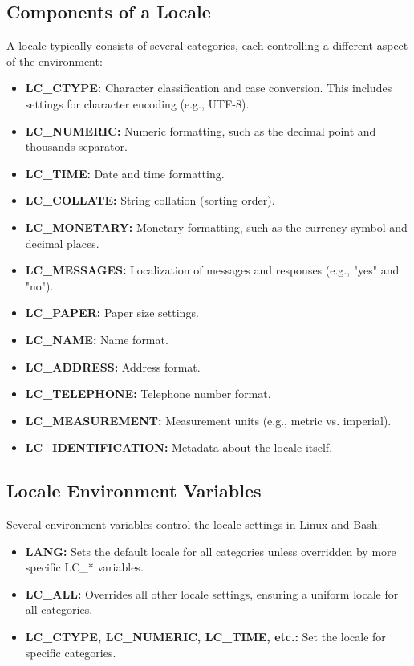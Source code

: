 \documentclass{report}
\begin{document}
    \subsection{Components of a Locale}
    \bigbreak \noindent 
    A locale typically consists of several categories, each controlling a different aspect of the environment:
    \begin{itemize}
        \item \textbf{LC\_CTYPE:} Character classification and case conversion. This includes settings for character encoding (e.g., UTF-8).
        \item \textbf{LC\_NUMERIC:} Numeric formatting, such as the decimal point and thousands separator.
        \item \textbf{LC\_TIME:} Date and time formatting.
        \item \textbf{LC\_COLLATE:} String collation (sorting order).
        \item \textbf{LC\_MONETARY:} Monetary formatting, such as the currency symbol and decimal places.
        \item \textbf{LC\_MESSAGES:} Localization of messages and responses (e.g., "yes" and "no").
        \item \textbf{LC\_PAPER:} Paper size settings.
        \item \textbf{LC\_NAME:} Name format.
        \item \textbf{LC\_ADDRESS:} Address format.
        \item \textbf{LC\_TELEPHONE:} Telephone number format.
        \item \textbf{LC\_MEASUREMENT:} Measurement units (e.g., metric vs. imperial).
        \item \textbf{LC\_IDENTIFICATION:} Metadata about the locale itself.

    \end{itemize}

    \bigbreak \noindent 
    \subsection{Locale Environment Variables}
    \bigbreak \noindent 
    Several environment variables control the locale settings in Linux and Bash:
    \begin{itemize}
        \item \textbf{LANG:} Sets the default locale for all categories unless overridden by more specific LC\_* variables.
        \item \textbf{LC\_ALL:} Overrides all other locale settings, ensuring a uniform locale for all categories.
        \item \textbf{LC\_CTYPE, LC\_NUMERIC, LC\_TIME, etc.:} Set the locale for specific categories.
    \end{itemize}
\end{document}
